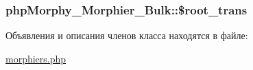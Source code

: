 \label{classphpMorphy__Morphier__Bulk_a0f5fce3501ff0a2743d796240813fe27}
\hypertarget{classphpMorphy__Morphier__Bulk_a242191674ec07debf33e8837f45d874a}{
\subsubsection[{\$root\_\-trans}]{\setlength{\rightskip}{0pt plus 5cm}phpMorphy\_\-Morphier\_\-Bulk::\$root\_\-trans}}
\label{classphpMorphy__Morphier__Bulk_a242191674ec07debf33e8837f45d874a}


Объявления и описания членов класса находятся в файле:\begin{DoxyCompactItemize}
\item 
\hyperlink{morphiers_8php}{morphiers.php}\end{DoxyCompactItemize}
